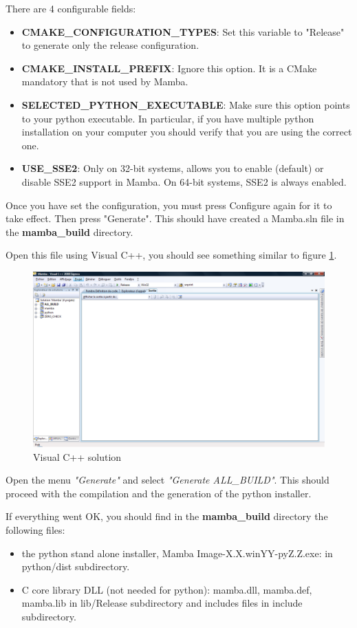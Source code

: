 \documentclass[a4paper,10pt,oneside]{article}
\begin{document}
There are 4 configurable fields:
\begin{itemize}
\item \textbf{CMAKE\_CONFIGURATION\_TYPES}: Set this variable to "Release" to 
generate only the release configuration.
\item \textbf{CMAKE\_INSTALL\_PREFIX}: Ignore this option. It is a CMake 
mandatory that is not used by Mamba.
\item \textbf{SELECTED\_PYTHON\_EXECUTABLE}: Make sure this option points 
to your python executable. In particular, if you have multiple python 
installation on your computer you should verify that you are using the 
correct one.
\item \textbf{USE\_SSE2}: Only on 32-bit systems, allows you to enable (default)
or disable SSE2 support in Mamba. On 64-bit systems, SSE2 is always enabled.
\end{itemize}

Once you have set the configuration, you must press Configure again for it to
take effect. Then press "Generate". This should have created a Mamba.sln file
in the \textbf{mamba\_build} directory.

Open this file using Visual C++, you should see something similar to figure
\ref{fig:visualcpp}.

\begin{figure}
\centering
\includegraphics[scale=0.3]{images/visualcpp.png}
\caption{Visual C++ solution}
\label{fig:visualcpp}
\end{figure}

Open the menu \textit{"Generate"} and select \textit{"Generate ALL\_BUILD"}.
This should proceed with the compilation and the generation of the python installer.

If everything went OK, you should find in the \textbf{mamba\_build} directory
the following files:
\begin{itemize}
\item the python stand alone installer, Mamba Image-X.X.winYY-pyZ.Z.exe: in python/dist subdirectory.
\item C core library DLL (not needed for python): mamba.dll, mamba.def, mamba.lib in lib/Release subdirectory and includes files in include subdirectory.
\end{itemize}
\end{document}

